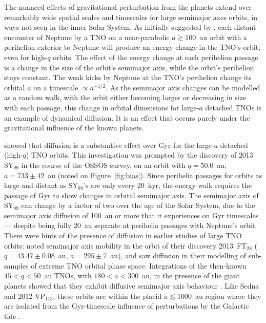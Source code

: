 \documentclass[preprint]{aastex62}
\begin{document}
The nuanced effects of gravitational perturbation from the planets extend over remarkably wide spatial scales and timescales for large semimajor axes orbits, in ways not seen in the inner Solar System.
As initially suggested by \citet{Duncan1987}, each distant encounter of Neptune by a TNO on a near-parabolic $a \gtrsim 100$~au orbit with a perihelion exterior to Neptune will produce an energy change in the TNO's orbit, even for high-$q$ orbits. 
The effect of the energy change at each perihelion passage is a change in the size of the orbit's semimajor axis, while the orbit's perihelion stays constant.
The weak kicks by Neptune at the TNO's perihelion change its orbital $a$ on a timescale $\propto a^{-1/2}$.
As the semimajor axis changes can be modelled as a random walk, with the orbit either becoming larger or decreasing in size with each passage, this change in orbital dimensions for large-$a$ detached TNOs is an example of dynamical diffusion.
It is an effect that occurs purely under the gravitational influence of the known planets.

\citet{bannister17} showed that diffusion is a substantive effect over Gyr for the large-$a$ detached (high-$q$) TNO orbits.
This investigation was prompted by the discovery of 2013 SY$_{99}$ in the course of the OSSOS survey, on an orbit with $q = 50.0$~au, $a = 733 \pm 42$~au (noted on Figure~\ref{fig:bias}).
Since perihelia passages for orbits as large and distant as SY$_{99}$'s are only every 20~kyr, the energy walk requires the passage of Gyr to show changes in orbital semimajor axis.
The semimajor axis of SY$_{99}$ can change by a factor of two over the age of the Solar System, due to the semimajor axis diffusion of 100~au or more that it experiences on Gyr timescales --- despite being fully 20~au separate at perihelia passages with Neptune's orbit.
There were hints of the presence of diffusion in earlier studies of large TNO orbits: \citet{sheppardtrujillo16} noted semimajor axis mobility in the orbit of their discovery 2013~FT$_{28}$ ($q = 43.47 \pm 0.08$~au, $a = 295 \pm 7$~au), and \citet{gallardo12,brasserschwamb15} saw diffusion in their modelling of sub-samples of extreme TNO orbital phase space.
Integrations of the then-known $45<q<50$~au TNOs, with $180 < a < 300$~au, in the presence of the giant planets showed that they exhibit diffusive semimajor axis behaviour \citep{bannister17}. 
Like Sedna and 2012 VP$_{113}$, these orbits are within the placid $a \lesssim 1000$~au region where they are isolated from the Gyr-timescale influence of perturbations by the Galactic tide \citep{brasserschwamb15}.
\end{document}
